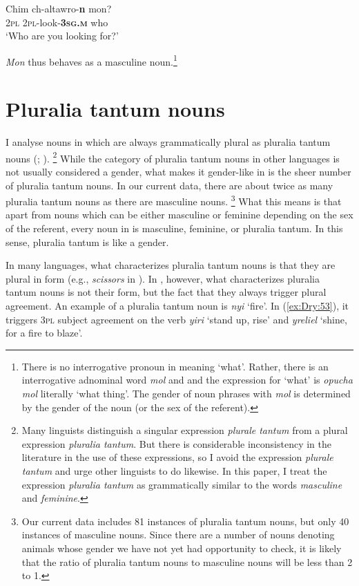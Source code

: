 \documentclass[output=collectionpaper]{langsci/langscibook}
\begin{document}
\ea \label{ex:Dry:52}
\gll Chim	ch-altawro-\textbf{n}	mon?\\
\textsc{2pl} \textsc{2pl}-look-\textbf{\textsc{3sg.m}} who\\
\glt `Who are you looking for?'
\z

\textit{Mon} thus behaves as a masculine noun.\footnote{There is no interrogative pronoun in  meaning `what'. Rather, there is an interrogative adnominal word \textit{mol} and and the expression for `what' is \textit{opucha mol} literally `what thing'. The gender of noun phrases with \textit{mol} is determined by the gender of the noun (or the sex of the referent).}

\section{Pluralia tantum nouns}
\label{sec:Dry:4}

I analyse nouns in  which are always grammatically plural as pluralia tantum nouns (\citealt[233ff]{Corbett2012}; \citealt{Acquaviva2008}).%
\footnote{Many linguists distinguish a singular expression \textit{plurale tantum} from a plural expression \textit{pluralia tantum}. But there is considerable inconsistency in the literature in the use of these expressions, so I avoid the expression \textit{plurale tantum} and urge other linguists to do likewise. In this paper, I treat the expression \textit{pluralia tantum} as grammatically similar to the words \textit{masculine} and \textit{feminine}.} %
While the category of pluralia tantum nouns in other languages is not usually considered a gender, what makes it gender-like in  is the sheer number of pluralia tantum nouns. In our current data, there are about twice as many pluralia tantum nouns as there are masculine nouns.%
\footnote{Our current data includes 81 instances of pluralia tantum nouns, but only 40 instances of masculine nouns. Since there are a number of nouns denoting animals whose gender we have not yet had opportunity to check, it is likely that the ratio of pluralia tantum nouns to masculine nouns will be less than 2 to 1.} %
What this means is that apart from nouns which can be either masculine or feminine depending on the sex of the referent, every noun in  is masculine, feminine, or pluralia tantum. In this sense, pluralia tantum is like a gender.

In many languages, what characterizes pluralia tantum nouns is that they are plural in form (e.g., \textit{scissors} in ). In , however, what characterizes pluralia tantum nouns is not their form, but the fact that they always trigger plural agreement. An example of a pluralia tantum noun is \textit{nyi} `fire'. In (\ref{ex:Dry:53}), it triggers \textsc{3pl} subject agreement on the verb \textit{yiri} `stand up, rise' and \textit{yreliel} `shine, for a fire to blaze'.
\end{document}
